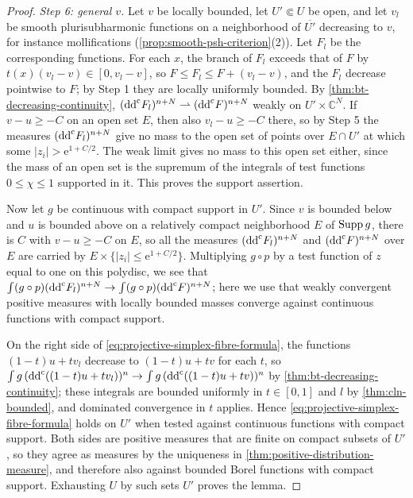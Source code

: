 \begin{proof}
\emph{Step 6: general $v$.} Let $v$ be locally bounded, let $U'\Subset U$ be open, and let $v_l$ be smooth plurisubharmonic functions on a neighborhood of $\overline{U'}$ decreasing to $v$, for instance mollifications (\cref{prop:smooth-psh-criterion}(2)). Let $F_l$ be the corresponding functions. For each $x$, the branch of $F_l$ exceeds that of $F$ by $t(x)(v_l-v)\in[0,v_l-v]$, so $F\leq F_l\leq F+(v_l-v)$, and the $F_l$ decrease pointwise to $F$; by Step 1 they are locally uniformly bounded. By \cref{thm:bt-decreasing-continuity}, $(\mathrm{dd}^{\mathrm{c}} F_l)^{n+N}\rightharpoonup(\mathrm{dd}^{\mathrm{c}} F)^{n+N}$ weakly on $U'\times\mathbb C^N$. If $v-u\geq-C$ on an open set $E$, then also $v_l-u\geq-C$ there, so by Step 5 the measures $(\mathrm{dd}^{\mathrm{c}} F_l)^{n+N}$ give no mass to the open set of points over $E\cap U'$ at which some $|z_i|>\mathrm e^{1+C/2}$. The weak limit gives no mass to this open set either, since the mass of an open set is the supremum of the integrals of test functions $0\leq\chi\leq1$ supported in it. This proves the support assertion.

Now let $g$ be continuous with compact support in $U'$. Since $v$ is bounded below and $u$ is bounded above on a relatively compact neighborhood $E$ of $\operatorname{Supp} g$, there is $C$ with $v-u\geq-C$ on $E$, so all the measures $(\mathrm{dd}^{\mathrm{c}} F_l)^{n+N}$ and $(\mathrm{dd}^{\mathrm{c}} F)^{n+N}$ over $E$ are carried by $E\times\{|z_i|\leq\mathrm e^{1+C/2}\}$. Multiplying $g\circ p$ by a test function of $z$ equal to one on this polydisc, we see that $\int(g\circ p)(\mathrm{dd}^{\mathrm{c}} F_l)^{n+N}\to\int(g\circ p)(\mathrm{dd}^{\mathrm{c}} F)^{n+N}$; here we use that weakly convergent positive measures with locally bounded masses converge against continuous functions with compact support.

On the right side of \eqref{eq:projective-simplex-fibre-formula}, the functions $(1-t)u+tv_l$ decrease to $(1-t)u+tv$ for each $t$, so $\int g\,(\mathrm{dd}^{\mathrm{c}}((1-t)u+tv_l))^n\to\int g\,(\mathrm{dd}^{\mathrm{c}}((1-t)u+tv))^n$ by \cref{thm:bt-decreasing-continuity}; these integrals are bounded uniformly in $t\in[0,1]$ and $l$ by \cref{thm:cln-bounded}, and dominated convergence in $t$ applies. Hence \eqref{eq:projective-simplex-fibre-formula} holds on $U'$ when tested against continuous functions with compact support. Both sides are positive measures that are finite on compact subsets of $U'$, so they agree as measures by the uniqueness in \cref{thm:positive-distribution-measure}, and therefore also against bounded Borel functions with compact support. Exhausting $U$ by such sets $U'$ proves the lemma.
\end{proof}


